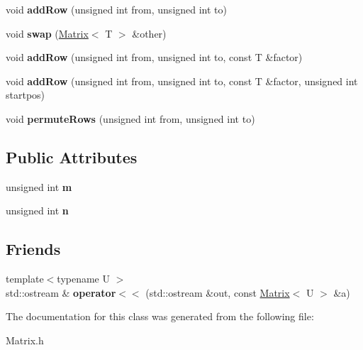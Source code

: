\begin{DoxyCompactItemize}
\item 
\mbox{\label{class_matrix_a7f565908db48ce8cac5ca92fa2490dcb}} 
void {\bfseries add\+Row} (unsigned int from, unsigned int to)
\item 
\mbox{\label{class_matrix_a46e6f9250a3558265d656d758fc3ceef}} 
void {\bfseries swap} (\mbox{\hyperlink{class_matrix}{Matrix}}$<$ T $>$ \&other)
\item 
\mbox{\label{class_matrix_a477f0b864eb579894806445ba3c61de3}} 
void {\bfseries add\+Row} (unsigned int from, unsigned int to, const T \&factor)
\item 
\mbox{\label{class_matrix_a227499495cddf99812735f8f0b8b33e0}} 
void {\bfseries add\+Row} (unsigned int from, unsigned int to, const T \&factor, unsigned int startpos)
\item 
\mbox{\label{class_matrix_ad81efa0eecf3b1ecf464b70f405aa246}} 
void {\bfseries permute\+Rows} (unsigned int from, unsigned int to)
\end{DoxyCompactItemize}
\subsection*{Public Attributes}
\begin{DoxyCompactItemize}
\item 
\mbox{\label{class_matrix_a0a922a1712cf7e9afb32fd8fff6809df}} 
unsigned int {\bfseries m}
\item 
\mbox{\label{class_matrix_afe2ef09343ff36b98618d696e7b232e3}} 
unsigned int {\bfseries n}
\end{DoxyCompactItemize}
\subsection*{Friends}
\begin{DoxyCompactItemize}
\item 
\mbox{\label{class_matrix_abe73619c6b45315d7efd6a2074ed71bd}} 
{\footnotesize template$<$typename U $>$ }\\std\+::ostream \& {\bfseries operator$<$$<$} (std\+::ostream \&out, const \mbox{\hyperlink{class_matrix}{Matrix}}$<$ U $>$ \&a)
\end{DoxyCompactItemize}


The documentation for this class was generated from the following file\+:\begin{DoxyCompactItemize}
\item 
Matrix.\+h\end{DoxyCompactItemize}
